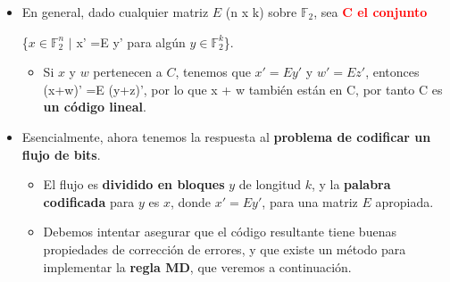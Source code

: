 \documentclass{beamer}
\theoremstyle{plain}
\theoremstyle{example}
\newtheorem{ejercicio} [Ejercicio]{Ejercicio}
\theoremstyle{example}
\begin{document}
\begin{frame}  \small  
\begin{itemize} 

\item  En general, dado cualquier matriz $E$ (n x k) sobre $\mathbb{F}_2$, sea \textcolor{red}{\textbf{C el conjunto}} 

\begin{center}
 \{$x \in \mathbb{F}_2^n$ $|$ x' =E y' \; \; para algún $y \in \mathbb{F}_2^k$\}.
\end{center}

\begin{itemize} 
\item Si $x$ y $w$ pertenecen a  $C$, tenemos que $x'=Ey'$ y $w' =Ez'$, entonces (x+w)' =E (y+z)', por lo que x + w también están en C, por tanto C es\textbf{ un código lineal}.
\end{itemize} 

\item Esencialmente, ahora tenemos la respuesta al \textbf{problema de codificar un flujo de bits}. 


\begin{itemize} 

\item El flujo es \textbf{dividido en bloques} $y$ de longitud $k$, y la \textbf{palabra codificada} para $y$ es $x$, donde $x'=Ey'$, para una matriz $E$ apropiada. 
\vspace{0.2cm}
\item Debemos intentar asegurar que el código resultante tiene buenas propiedades de corrección de errores, y que existe un método para implementar la \textbf{regla MD}, que veremos a continuación.
\end{itemize} 

\end{itemize} 


\end{frame} 

\end{document}
